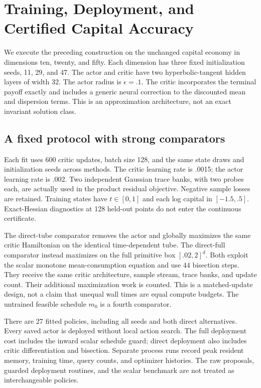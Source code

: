 \section{Training, Deployment, and Certified Capital Accuracy}\label{sec:r10study}
We execute the preceding construction on the unchanged capital economy in dimensions ten, twenty, and fifty. Each dimension has three fixed initialization seeds, 11, 29, and 47. The actor and critic have two hyperbolic-tangent hidden layers of width 32. The actor radius is $\epsilon=.1$. The critic incorporates the terminal payoff exactly and includes a generic neural correction to the discounted mean and dispersion terms. This is an approximation architecture, not an exact invariant solution class.

\subsection{A fixed protocol with strong comparators}
Each fit uses 600 critic updates, batch size 128, and the same state draws and initialization seeds across methods. The critic learning rate is .0015; the actor learning rate is .002. Two independent Gaussian trace banks, with two probes each, are actually used in the product residual objective. Negative sample losses are retained. Training states have $t\in[0,1]$ and each log capital in $[-1.5,.5]$. Exact-Hessian diagnostics at 128 held-out points do not enter the continuous certificate.

The direct-tube comparator removes the actor and globally maximizes the same critic Hamiltonian on the identical time-dependent tube. The direct-full comparator instead maximizes on the full primitive box $[.02,2]^d$. Both exploit the scalar monotone mean-consumption equation and use 44 bisection steps. They receive the same critic architecture, sample stream, trace banks, and update count. Their additional maximization work is counted. This is a matched-update design, not a claim that unequal wall times are equal compute budgets. The untrained feasible schedule $m_0$ is a fourth comparator.

There are 27 fitted policies, including all seeds and both direct alternatives. Every saved actor is deployed without local action search. The full deployment cost includes the inward scalar schedule guard; direct deployment also includes critic differentiation and bisection. Separate process runs record peak resident memory, training time, query counts, and optimizer histories. The raw proposals, guarded deployment routines, and the scalar benchmark are not treated as interchangeable policies.

